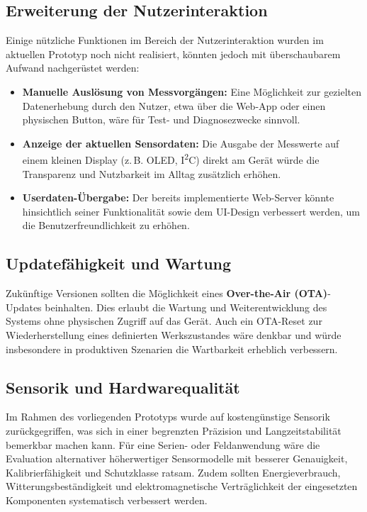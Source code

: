 \subsection{Erweiterung der Nutzerinteraktion}

Einige nützliche Funktionen im Bereich der Nutzerinteraktion wurden im aktuellen Prototyp noch nicht realisiert, könnten jedoch mit überschaubarem Aufwand nachgerüstet werden:
\\

\begin{itemize}
	\item \textbf{Manuelle Auslösung von Messvorgängen:} Eine Möglichkeit zur gezielten Datenerhebung durch den Nutzer, etwa über die Web-App oder einen physischen Button, wäre für Test- und Diagnosezwecke sinnvoll.
	\item \textbf{Anzeige der aktuellen Sensordaten:} Die Ausgabe der Messwerte auf einem kleinen Display (z.\,B. OLED, I\textsuperscript{2}C) direkt am Gerät würde die Transparenz und Nutzbarkeit im Alltag zusätzlich erhöhen.
	\item \textbf{Userdaten-Übergabe:} Der bereits implementierte Web-Server könnte hinsichtlich seiner Funktionalität sowie dem UI-Design verbessert werden, um die Benutzerfreundlichkeit zu erhöhen.
\end{itemize}


\subsection{Updatefähigkeit und Wartung}

Zukünftige Versionen sollten die Möglichkeit eines \textbf{Over-the-Air (OTA)}-Updates beinhalten. Dies erlaubt die Wartung und Weiterentwicklung des Systems ohne physischen Zugriff auf das Gerät. Auch ein OTA-Reset zur Wiederherstellung eines definierten Werkszustandes wäre denkbar und würde insbesondere in produktiven Szenarien die Wartbarkeit erheblich verbessern.

\subsection{Sensorik und Hardwarequalität}

Im Rahmen des vorliegenden Prototyps wurde auf kostengünstige Sensorik zurückgegriffen, was sich in einer begrenzten Präzision und Langzeitstabilität bemerkbar machen kann. Für eine Serien- oder Feldanwendung wäre die Evaluation alternativer höherwertiger Sensormodelle mit besserer Genauigkeit, Kalibrierfähigkeit und Schutzklasse ratsam. Zudem sollten Energieverbrauch, Witterungsbeständigkeit und elektromagnetische Verträglichkeit der eingesetzten Komponenten systematisch verbessert werden.

